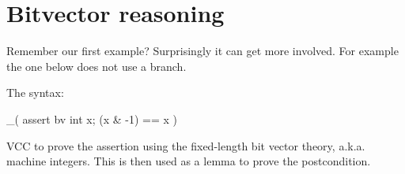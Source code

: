 \section{Bitvector reasoning}
\label{sect:bv}

Remember our first  example?  Surprisingly it can get more involved.
For example the one below does not use a branch.


\noindent
The syntax:
\begin{VCC}
_( assert {bv} \forall int x; (x & -1) == x )
\end{VCC}

\noindent
VCC to prove the assertion using the fixed-length bit vector theory, a.k.a. machine integers.
This is then used as a lemma to prove the postcondition.



